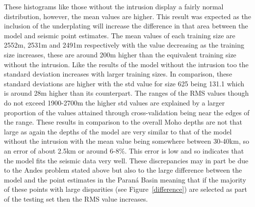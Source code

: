 These histograms like those without the intrusion display a fairly normal distribution, however, the mean values are higher. This result was expected as the inclusion of the underplating will increase the difference in that area between the model and seismic point estimates. The mean values of each training size are 2552m, 2531m and 2491m respectively with the value decreasing as the training size increases, these are around 200m higher than the equivalent training size without the intrusion. Like the results of the model without the intrusion too the standard deviation increases with larger training sizes. In comparison, these standard deviations are higher with the std value for size 625 being 131.1 which is around 28m higher than its counterpart. The ranges of the RMS values though do not exceed 1900-2700m the higher std values are explained by a larger proportion of the values attained through cross-validation being near the edges of the range.
These results in comparison to the overall Moho depths are not that large as again the depths of the model are very similar to that of the model without the intrusion with the mean value being somewhere between 30-40km, so an error of about 2.5km or around 6-8\%. This error is low and so indicates that the model fits the seismic data very well. These discrepancies may in part be due to the Andes problem stated above but also to the large difference between the model and the point estimates in the Paraná Basin meaning that if the majority of these points with large disparities (see Figure~\ref{difference}) are selected as part of the testing set then the RMS value increases.
